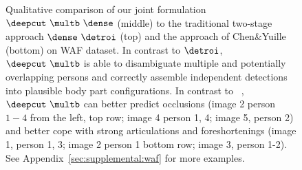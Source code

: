 \begin{figure}
\begin{tabular}{c c c c c c}
  \end{tabular}
\caption{Qualitative comparison of our joint formulation
  $\deepcut~\multb~\dense$ (middle) to the traditional two-stage
  approach $\dense~\detroi$ (top) and the approach of
  Chen\&Yuille~\cite{Chen:2015:POC} (bottom) on WAF dataset. In
  contrast to $\detroi$, $\deepcut~\multb$ is able to disambiguate
  multiple and potentially overlapping persons and correctly assemble
  independent detections into plausible body part configurations. In
  contrast to ~\cite{Chen:2015:POC}, $\deepcut~\multb$ can better
  predict occlusions (image 2 person $1-4$ from the left, top row;
  image 4 person 1, 4; image 5, person 2) and better cope with strong
  articulations and foreshortenings (image 1, person 1, 3; image 2
  person 1 bottom row; image 3, person 1-2). See
  Appendix~\ref{sec:supplemental:waf} for more examples.
  }
   \vspace{-1.0em}
  \label{fig:qualitative_waf_2}
\end{figure}
